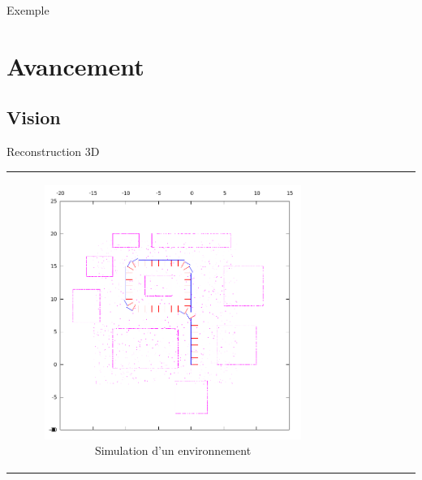 \documentclass{beamer}
\begin{document}
\begin{frame}{Exemple}
  \printbibliography[heading=none]
\end{frame}


\section{Avancement}

\subsection*{Vision}
\begin{frame}{Reconstruction 3D}
  \begin{tabular}{c c}
    \begin{minipage}{0.5\linewidth}
      \begin{figure}
        \includegraphics[width=0.9\linewidth]{images/createimages.png}
        \caption{Simulation d'un environnement}
      \end{figure}
    \end{minipage}
    &
    \begin{minipage}{0.5\linewidth}
      \begin{figure}

\end{figure}
\end{minipage}
\end{tabular}
\end{frame}
\end{document}
